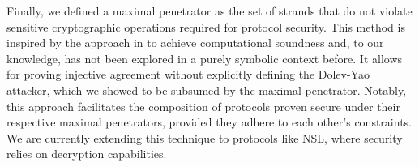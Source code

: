Finally, we defined a maximal penetrator as the set of strands that do not violate sensitive cryptographic operations required for protocol security. This method is inspired by the approach in \cite{banaSymbolic} to achieve computational soundness and, to our knowledge, has not been explored in a purely symbolic context before. It allows for proving injective agreement without explicitly defining the Dolev-Yao attacker, which we showed to be  subsumed by the maximal penetrator. Notably, this approach facilitates the composition of protocols proven secure under their respective maximal penetrators, provided they adhere to each other's constraints. We are currently extending this technique to protocols like NSL, where security relies on decryption capabilities.

